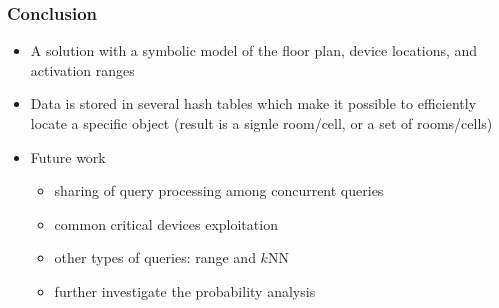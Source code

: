 
\begin{frame}
\frametitle{Conclusion}

\begin{itemize}
	\item A solution with a symbolic model of the floor plan, device locations, and activation ranges
  \item Data is stored in several hash tables which make it possible to efficiently locate a specific object (result is a signle room/cell, or a set of rooms/cells)
  \item Future work
    \begin{itemize}
      \item sharing of query processing among concurrent queries
      \item common critical devices exploitation
      \item other types of queries: range and $k$NN
      \item further investigate the probability analysis
    \end{itemize}
\end{itemize}

\end{frame}
